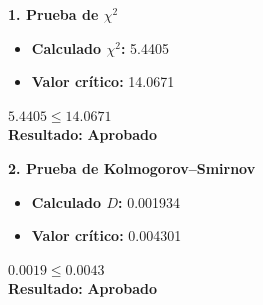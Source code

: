 \noindent
\begin{minipage}[t]{0.48\textwidth}
    \textbf{1. Prueba de \(\chi^2\)}
    \vspace{0.3cm}
    \begin{itemize}[itemsep=0.4em]
        \item \textbf{Calculado \(\chi^2\):} 5.4405
        \item \textbf{Valor crítico:} 14.0671
    \end{itemize}

    \begin{center}
        \vspace{0.5cm}
        \(5.4405 \leq 14.0671\)
        \vspace{0.1cm}
        \\\textbf{Resultado: }
        \textcolor{green!60!black}{\textbf{Aprobado}}
    \end{center}

    \vspace{0.8cm}

    \textbf{2. Prueba de Kolmogorov--Smirnov}
    \vspace{0.3cm}
    \begin{itemize}[itemsep=0.4em]
        \item \textbf{Calculado \(D\):} 0.001934
        \item \textbf{Valor crítico:} 0.004301
    \end{itemize}
    \begin{center}
        \vspace{0.5cm}
        \(0.0019 \leq 0.0043\)
        \vspace{0.1cm}
        \\\textbf{Resultado: }
        \textcolor{green!60!black}{\textbf{Aprobado}}
    \end{center}

\end{minipage}
\hfill
